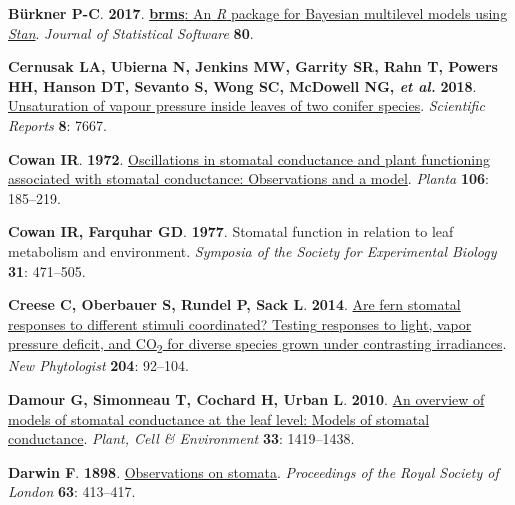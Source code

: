 \documentclass[
  letterpaper,
  DIV=11,
  numbers=noendperiod]{scrartcl}
\newlength{\cslhangindent}
\newenvironment{CSLReferences}[2] %
 {\begin{list}{}{%
  \setlength{\itemindent}{0pt}
  \setlength{\leftmargin}{0pt}
  \setlength{\parsep}{0pt}
  \ifodd #1
   \setlength{\leftmargin}{\cslhangindent}
   \setlength{\itemindent}{-1\cslhangindent}
  \fi
  \setlength{\itemsep}{#2\baselineskip}}}
 {\end{list}}
\begin{document}
\begin{CSLReferences}{0}{1}
\textbf{\textbf{Bürkner P-C}}. \textbf{2017}.
\href{https://doi.org/10.18637/jss.v080.i01}{{\textbf{brms}}: {An}
{\emph{R}} package for {Bayesian} multilevel models using
{\emph{Stan}}}. \emph{Journal of Statistical Software} \textbf{80}.

\textbf{\textbf{Cernusak LA}, \textbf{Ubierna N}, \textbf{Jenkins MW},
\textbf{Garrity SR}, \textbf{Rahn T}, \textbf{Powers HH}, \textbf{Hanson
DT}, \textbf{Sevanto S}, \textbf{Wong SC}, \textbf{McDowell NG},
\emph{et al.}} \textbf{2018}.
\href{https://doi.org/10.1038/s41598-018-25838-2}{Unsaturation of vapour
pressure inside leaves of two conifer species}. \emph{Scientific
Reports} \textbf{8}: 7667.

\textbf{\textbf{Cowan IR}}. \textbf{1972}.
\href{https://doi.org/10.1007/BF00388098}{Oscillations in stomatal
conductance and plant functioning associated with stomatal conductance:
{Observations} and a model}. \emph{Planta} \textbf{106}: 185--219.

\textbf{\textbf{Cowan IR}, \textbf{Farquhar GD}}. \textbf{1977}.
Stomatal function in relation to leaf metabolism and environment.
\emph{Symposia of the Society for Experimental Biology} \textbf{31}:
471--505.

\textbf{\textbf{Creese C}, \textbf{Oberbauer S}, \textbf{Rundel P},
\textbf{Sack L}}. \textbf{2014}.
\href{https://doi.org/10.1111/nph.12922}{Are fern stomatal responses to
different stimuli coordinated? {Testing} responses to light, vapor
pressure deficit, and {CO}{\textsubscript{2}} for diverse species grown
under contrasting irradiances}. \emph{New Phytologist} \textbf{204}:
92--104.

\textbf{\textbf{Damour G}, \textbf{Simonneau T}, \textbf{Cochard H},
\textbf{Urban L}}. \textbf{2010}.
\href{https://doi.org/10.1111/j.1365-3040.2010.02181.x}{An overview of
models of stomatal conductance at the leaf level: {Models} of stomatal
conductance}. \emph{Plant, Cell \& Environment} \textbf{33}: 1419--1438.

\textbf{\textbf{Darwin F}}. \textbf{1898}.
\href{https://doi.org/10.1098/rspl.1898.0053}{Observations on stomata}.
\emph{Proceedings of the Royal Society of London} \textbf{63}: 413--417.


\end{CSLReferences}
\end{document}
